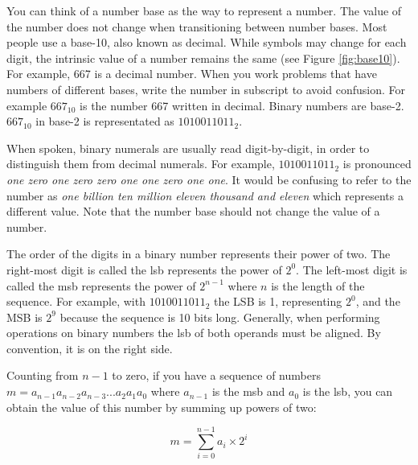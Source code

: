 You can think of a number base as the way to represent a number. The value of the number does not 
change when transitioning between number bases. Most people use a \gls{base-10}, also known as decimal.
While symbols may change for each digit, the intrinsic value of a number remains the same (see Figure \ref{fig:base10}). 
For example, 667 is a decimal number. When you work problems that have numbers of different bases, 
write the number in subscript to avoid confusion. For example $667_{10}$ is the number 667 written in 
decimal. Binary numbers are \gls{base-2}. $667_{10}$ in \gls{base-2} is representated as $1010011011_2$. 

When spoken, binary numerals are usually read digit-by-digit, in order to distinguish them from 
decimal numerals. For example, $1010011011_2$ is pronounced \textit{one zero one zero zero one 
one zero one one}. It would be confusing to refer to the number as \textit{one billion ten million 
eleven thousand and eleven} which represents a different value. Note that the number base should 
not change the value of a number.

The order of the digits in a binary number represents their power of two. The right-most digit is 
called the \gls{lsb} represents the power of $2^0$. The left-most digit is called 
the \gls{msb} represents the power of $2^{n-1}$ where $n$ is the length of the 
sequence. For example, with $1010011011_2$ the LSB is 1, representing $2^0$, and the MSB is $2^9$ 
because the sequence is 10 bits long. Generally, when performing operations on binary numbers the 
\gls{lsb} of both operands must be aligned. By convention, it is on the right side.

Counting from $n-1$ to zero, if you have a sequence of numbers $m = a_{n-1}a_{n-2}a_{n-3}...a_2a_1a_0$ 
where $a_{n-1}$ is the \gls{msb} and $a_0$ is the \gls{lsb}, you can obtain the value of this number 
by summing up powers of two:

\begin{equation}\label{eq:base2}
    m = \sum_{i=0}^{n-1} a_i \times 2^i
\end{equation}

\begin{figure}[t]
\end{figure}


